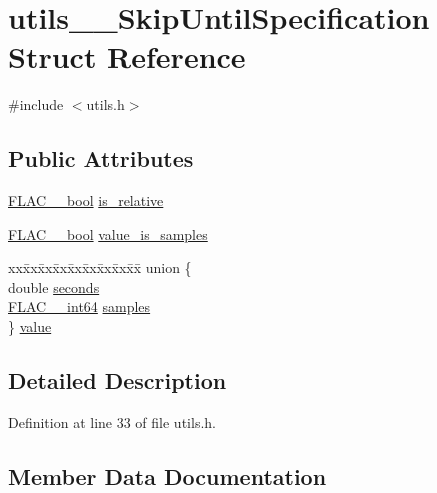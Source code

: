 \hypertarget{structutils_____skip_until_specification}{}\section{utils\+\_\+\+\_\+\+Skip\+Until\+Specification Struct Reference}
\label{structutils_____skip_until_specification}


{\ttfamily \#include $<$utils.\+h$>$}

\subsection*{Public Attributes}
\begin{DoxyCompactItemize}
\item 
\hyperlink{ordinals_8h_a95103469f1cbd78b8cf250194985b34e}{F\+L\+A\+C\+\_\+\+\_\+bool} \hyperlink{structutils_____skip_until_specification_a6a5f7a64c7161adb11b74cb38659ea8e}{is\+\_\+relative}
\item 
\hyperlink{ordinals_8h_a95103469f1cbd78b8cf250194985b34e}{F\+L\+A\+C\+\_\+\+\_\+bool} \hyperlink{structutils_____skip_until_specification_a2808046d55dfe4bae453b5399b0cd416}{value\+\_\+is\+\_\+samples}
\item 
\begin{tabbing}
xx\=xx\=xx\=xx\=xx\=xx\=xx\=xx\=xx\=\kill
union \{\\
\>double \hyperlink{structutils_____skip_until_specification_af2cce424e1d89a678b796fb6d5776fdc}{seconds}\\
\>\hyperlink{ordinals_8h_a12b57f75f760b9062a13bcda1bdb3f3e}{FLAC\_\_int64} \hyperlink{structutils_____skip_until_specification_a0c5dce92c478d9d456c163d497e64edf}{samples}\\
\} \hyperlink{structutils_____skip_until_specification_ad0878e1e24888a902faa423236a7cc47}{value}\\

\end{tabbing}\end{DoxyCompactItemize}


\subsection{Detailed Description}


Definition at line 33 of file utils.\+h.



\subsection{Member Data Documentation}
